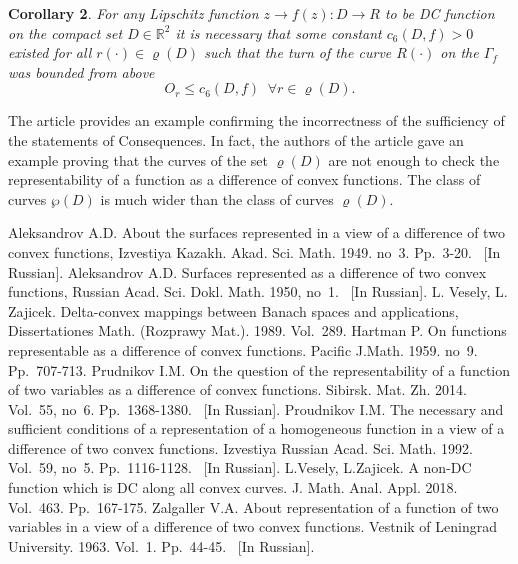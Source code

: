 \documentclass[12pt]{llncs}
\begin{document}
{\bf Corollary 2}. {\em For any Lipschitz function $z \rightarrow
f(z) :D \rightarrow R$ to be DC function on the compact set $ D
\in \mathbb{R}^2$ it is necessary that some constant $c_6(D,f)>0$
existed for all $r(\cdot) \in \varrho(D)$ such that the turn of
the curve $R(\cdot)$  on the $\Gamma_f$ was bounded from above
$$
O_r \leq c_6(D,f)  \;\; \forall r \in \varrho(D).
$$ }

The article \cite{veselyzajicek} provides an example confirming
the incorrectness of the sufficiency of the statements of
Consequences. In fact, the authors of the article gave an example
proving that the curves of the set $\varrho(D)$ are not enough to
check the representability of a function as a difference of convex
functions. The class of curves $\wp(D)$ is much wider than the
class of curves $\varrho(D)$.



\begin{thebibliography}{13}

 Aleksandrov A.D. About the surfaces represented
in a view of a difference of two convex functions, Izvestiya
Kazakh. Akad. Sci.  Math. 1949. no~3.  Pp.~3-20. ~[In Russian].
 Aleksandrov A.D. Surfaces represented as a difference
of two convex   functions,  Russian Acad. Sci. Dokl. Math. 1950,
no~1. ~[In Russian].
 L. Vesely, L. Zajicek. Delta-convex mappings between Banach
spaces and applications, Dissertationes Math. (Rozprawy Mat.).
1989. Vol.~289.
 Hartman P. On functions representable as a difference of convex
functions. Pacific J.Math. 1959. no~9. Pp.~707-713.
 Prudnikov I.M. On the question of the representability
of a function of two variables as a difference of convex
functions. Sibirsk. Mat. Zh.  2014. Vol.~55, no~6. Pp.~1368-1380.
~[In Russian].
 Proudnikov I.M. The necessary and sufficient
conditions of a representation of a homogeneous function in a view
of a difference of two convex functions.  Izvestiya Russian Acad.
Sci. Math. 1992. Vol.~59, no~5.  Pp.~1116-1128. ~[In Russian].
 L.Vesely, L.Zajicek. A non-DC function which is DC
along all convex curves. J. Math. Anal. Appl. 2018. Vol.~463.
Pp.~167-175.
 Zalgaller V.A. About representation of a function
of two variables in a view of a difference of two convex
functions. Vestnik of Leningrad University. 1963. Vol.~1.
Pp.~44-45. ~[In Russian].
\end{thebibliography}

\end{document}
